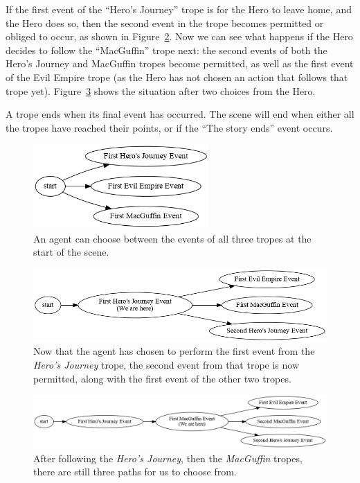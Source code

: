 \documentclass[11pt]{report}
\begin{document}
  If the first event of the ``Hero's Journey'' trope is for the Hero to leave
  home, and the Hero does so, then the second event in the trope becomes
  permitted or obliged to occur, as shown in Figure~\ref{fig:dot-combine2}. Now
  we can see what happens if the Hero decides to follow the ``MacGuffin'' trope
  next: the second events of both the Hero's Journey and MacGuffin tropes become
  permitted, as well as the first event of the Evil Empire trope (as the Hero
  has not chosen an action that follows that trope yet).
  Figure~\ref{fig:dot-combine3} shows the situation after two choices from the Hero.

  A trope ends when its final event has occurred. The scene will end when either
  all the tropes have reached their points, or if the ``The story ends'' event occurs.

\begin{figure}[!h]
\centerline{\includegraphics[width=0.6\textwidth]{combine1.png}}
\caption{An agent can choose between the events of all three tropes at the start
of the scene.}\label{fig:dot-combine1}
\end{figure}

\begin{figure}[!h]
\centerline{\includegraphics[width=\textwidth]{combine2.png}}
\caption{Now that the agent has chosen to perform the first event from the
  \emph{Hero's Journey} trope, the second event from that trope is now
  permitted, along with the first event of the other two tropes.}\label{fig:dot-combine2}
\end{figure}

\begin{figure}[!h]
\centerline{\includegraphics[width=\textwidth]{combine3.png}}
\caption{After following the \emph{Hero's Journey}, then the \emph{MacGuffin}
  tropes, there are still three paths for us to choose from.}\label{fig:dot-combine3}
\end{figure}
\end{document}
